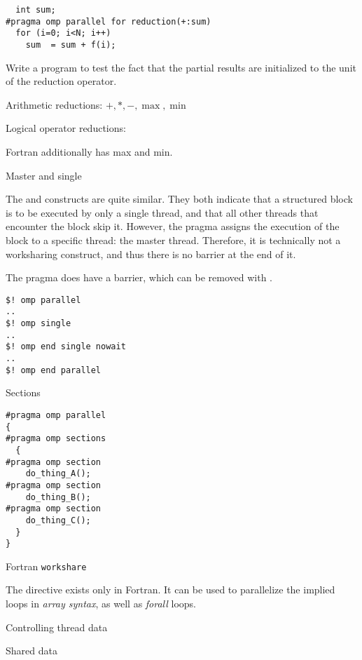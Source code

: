 \begin{verbatim}
  int sum;
#pragma omp parallel for reduction(+:sum)
  for (i=0; i<N; i++)
    sum  = sum + f(i);
\end{verbatim}

\begin{exercise}
  Write a program to test the fact that the partial results
  are initialized to the unit of the reduction operator.
\end{exercise}

Arithmetic reductions: $+,*,-,\max,\min$

Logical operator reductions: \n{&,&&,|,||,^}

Fortran additionally has max and min.

 {Master and single}

The  and  constructs
are quite similar. They both indicate that a structured block
is to be executed by only a single thread, and that all other threads
that encounter the block skip it. However, the  pragma
assigns the execution of the block to a specific thread: the master thread.
Therefore, it is technically not a worksharing construct, and thus
there is no barrier at the end of it.

The  pragma does have a barrier, which can be removed with
.
\begin{verbatim}
$! omp parallel
..
$! omp single
..
$! omp end single nowait
..
$! omp end parallel
\end{verbatim}

 {Sections}

\begin{verbatim}
#pragma omp parallel
{
#pragma omp sections
  {
#pragma omp section
    do_thing_A();
#pragma omp section
    do_thing_B();
#pragma omp section
    do_thing_C();
  }
}
\end{verbatim}

 {Fortran \texttt{workshare}}

The  directive exists only in Fortran.
It can be used to parallelize
the implied loops in \emph{array syntax},
as well as  \emph{forall} loops.


 {Controlling thread data}

 {Shared data}


